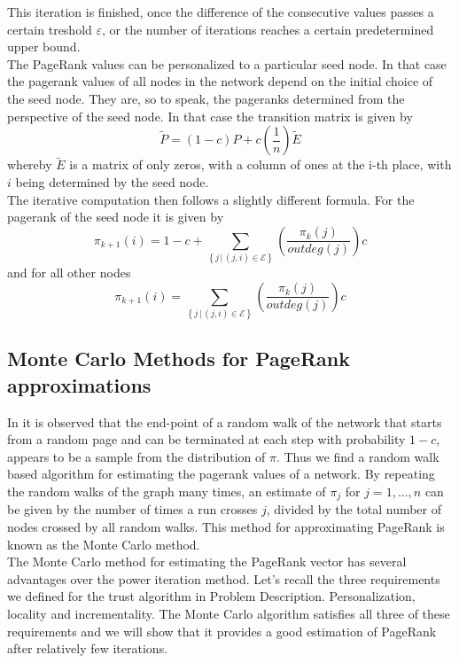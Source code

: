 \documentclass[sigconf]{acmart}
\theoremstyle{definition}
\begin{document}
\noindent This iteration is finished, once the difference of the consecutive values passes a certain treshold $\varepsilon$, or the number of iterations reaches a certain predetermined upper bound.\vspace{1em}\\

\noindent The PageRank values can be personalized to a particular seed node. In that case the pagerank values of all nodes in the network depend on the initial choice of the seed node. They are, so to speak, the pageranks determined from the perspective of the seed node. In that case the transition matrix is given by 
\[
\tilde{P} = (1-c)P + c\left(\frac{1}{n}\right)\tilde{E} 
\]
whereby $\tilde{E}$ is a matrix of only zeros, with a column of ones at the i-th place, with $i$ being determined by the seed node. \vspace{1em}\\

\noindent The iterative computation then follows a slightly different formula. For the pagerank of the seed node it is given by 
\[
\pi_{k+1}(i) = 1-c + \sum_{\left\lbrace j\,|\,(j,i)\in\mathcal{E}\right\rbrace}\left(\frac{\pi_k(j)}{outdeg(j)}\right)c 
\]
and for all other nodes 
\[
\pi_{k+1}(i) = \sum_{\left\lbrace j\,|\,(j,i)\in\mathcal{E}\right\rbrace}\left(\frac{\pi_k(j)}{outdeg(j)}\right)c 
\]
\subsection{Monte Carlo Methods for PageRank approximations}
\label{subsec:MonteCarloMethodsForPageRankApproximations}
In \citep{Monte Carlo methods in PageRank computation: When one iteration is sufficient} it is observed that the end-point of a random walk of the network that starts from a random page and can be terminated at each step with probability $1-c$, appears to be a sample from the distribution of $\pi$. Thus we find a random walk based algorithm for estimating the pagerank values of a network. By repeating the random walks of the graph many times, an estimate of $\pi_j$ for $j = 1,...,n$ can be given by the number of times a run crosses $j$, divided by the total number of nodes crossed by all random walks. This method for approximating PageRank is known as the Monte Carlo method. \vspace{1em}\\

\noindent The Monte Carlo method for estimating the PageRank vector has several advantages over the power iteration method. Let's recall the three requirements we defined for the trust algorithm in Problem Description. Personalization, locality and incrementality. The Monte Carlo algorithm satisfies all three of these requirements and we will show that it provides a good estimation of PageRank after relatively few iterations.\vspace{1em}\\
\end{document}
